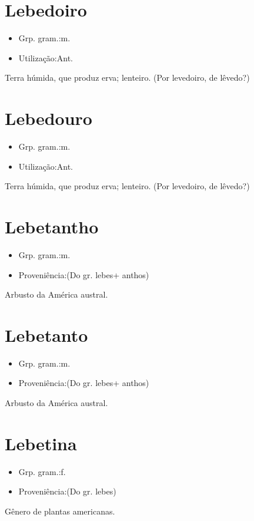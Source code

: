 \section{Lebedoiro}
\begin{itemize}
\item {Grp. gram.:m.}
\end{itemize}
\begin{itemize}
\item {Utilização:Ant.}
\end{itemize}
Terra húmida, que produz erva; lenteiro.
(Por \textunderscore levedoiro\textunderscore , de \textunderscore lêvedo\textunderscore ?)
\section{Lebedouro}
\begin{itemize}
\item {Grp. gram.:m.}
\end{itemize}
\begin{itemize}
\item {Utilização:Ant.}
\end{itemize}
Terra húmida, que produz erva; lenteiro.
(Por \textunderscore levedoiro\textunderscore , de \textunderscore lêvedo\textunderscore ?)
\section{Lebetantho}
\begin{itemize}
\item {Grp. gram.:m.}
\end{itemize}
\begin{itemize}
\item {Proveniência:(Do gr. \textunderscore lebes\textunderscore  + \textunderscore anthos\textunderscore )}
\end{itemize}
Arbusto da América austral.
\section{Lebetanto}
\begin{itemize}
\item {Grp. gram.:m.}
\end{itemize}
\begin{itemize}
\item {Proveniência:(Do gr. \textunderscore lebes\textunderscore  + \textunderscore anthos\textunderscore )}
\end{itemize}
Arbusto da América austral.
\section{Lebetina}
\begin{itemize}
\item {Grp. gram.:f.}
\end{itemize}
\begin{itemize}
\item {Proveniência:(Do gr. \textunderscore lebes\textunderscore )}
\end{itemize}
Gênero de plantas americanas.
